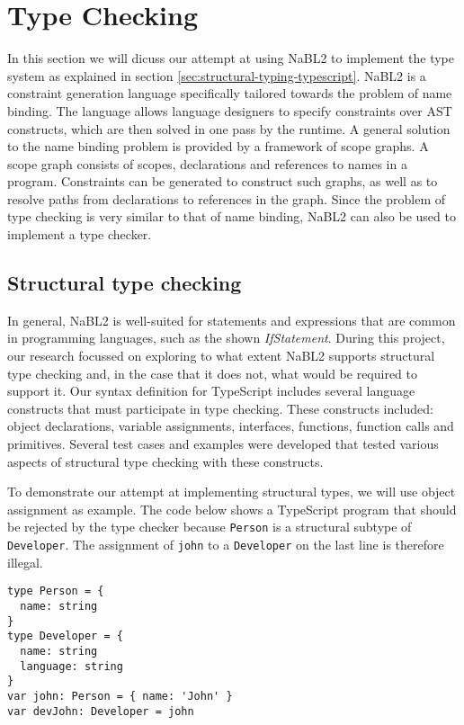 \newpage
\section{Type Checking}
\label{sec:type-checking}

In this section we will dicuss our attempt at using NaBL2 \citep{Antwerpen:2016:CLS:2847538.2847543} to implement the type system as explained in section \ref{sec:structural-typing-typescript}.
NaBL2 is a constraint generation language specifically tailored towards the problem of name binding.
The language allows language designers to specify constraints over AST constructs, which are then solved in one pass by the runtime.
A general solution to the name binding problem is provided by a framework of scope graphs.
A scope graph consists of scopes, declarations and references to names in a program.
Constraints can be generated to construct such graphs, as well as to resolve paths from declarations to references in the graph.
Since the problem of type checking is very similar to that of name binding, NaBL2 can also be used to implement a type checker.

\subsection{Structural type checking}

In general, NaBL2 is well-suited for statements and expressions that are common in programming languages, 
such as the shown \textit{IfStatement}.
During this project, our research focussed on exploring to what extent NaBL2 supports structural type checking and, 
in the case that it does not, what would be required to support it.
Our syntax definition for TypeScript includes several language constructs that must participate in type checking.
These constructs included: object declarations, variable assignments, interfaces, functions, function calls and primitives.
Several test cases and examples were developed that tested various aspects of structural type checking with these constructs.

To demonstrate our attempt at implementing structural types, we will use object assignment as example.
The code below shows a TypeScript program that should be rejected by the type checker 
because \texttt{Person} is a structural subtype of \texttt{Developer}. 
The assignment of \texttt{john} to a \texttt{Developer} on the last line is therefore illegal.
\begin{lstlisting}
type Person = {
  name: string
}
type Developer = {
  name: string
  language: string
}
var john: Person = { name: 'John' }
var devJohn: Developer = john
\end{lstlisting}

